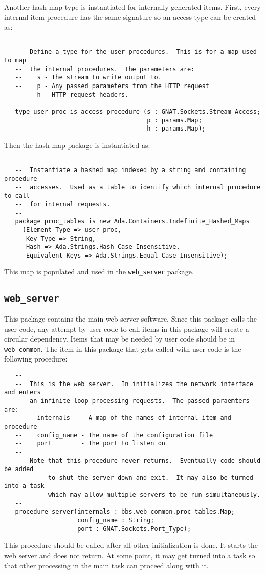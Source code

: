 \documentclass[10pt, openany, draft]{article}
\begin{document}
Another hash map type is instantiated for internally generated items.  First, every internal item procedure has the same signature so an access type can be created as:
\begin{verbatim}
   --
   --  Define a type for the user procedures.  This is for a map used to map
   --  the internal procedures.  The parameters are:
   --    s - The stream to write output to.
   --    p - Any passed parameters from the HTTP request
   --    h - HTTP request headers.
   --
   type user_proc is access procedure (s : GNAT.Sockets.Stream_Access;
                                       p : params.Map;
                                       h : params.Map);
\end{verbatim}
Then the hash map package is instantiated as:
\begin{verbatim}
   --
   --  Instantiate a hashed map indexed by a string and containing procedure
   --  accesses.  Used as a table to identify which internal procedure to call
   --  for internal requests.
   --
   package proc_tables is new Ada.Containers.Indefinite_Hashed_Maps
     (Element_Type => user_proc,
      Key_Type => String,
      Hash => Ada.Strings.Hash_Case_Insensitive,
      Equivalent_Keys => Ada.Strings.Equal_Case_Insensitive);
\end{verbatim}
This map is populated and used in the \texttt{web\_server} package.

\subsection{\texttt{web\_server}}
This package contains the main web server software.  Since this package calls the user code, any attempt by user code to call items in this package will create a circular dependency.  Items that may be needed by user code should be in \texttt{web\_common}.  The item in this package that gets called with user code is the following procedure:
\begin{verbatim}
   --
   --  This is the web server.  In initializes the network interface and enters
   --  an infinite loop processing requests.  The passed paraemters are:
   --    internals   - A map of the names of internal item and procedure
   --    config_name - The name of the configuration file
   --    port        - The port to listen on
   --
   --  Note that this procedure never returns.  Eventually code should be added
   --       to shut the server down and exit.  It may also be turned into a task
   --       which may allow multiple servers to be run simultaneously.
   --
   procedure server(internals : bbs.web_common.proc_tables.Map;
                    config_name : String;
                    port : GNAT.Sockets.Port_Type);
\end{verbatim}
This procedure should be called after all other initialization is done.  It starts the web server and does not return.  At some point, it may get turned into a task so that other processing in the main task can proceed along with it.
\end{document}
